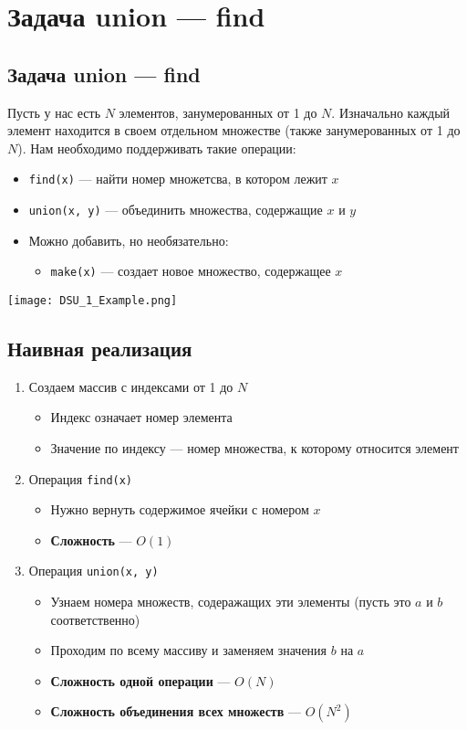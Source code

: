 \documentclass[a4paper]{article}
\newcommand{\code}[1]{\colorbox{codegray}{\texttt{#1}}}
\begin{document}
\section{Задача union — find}
\subsection{Задача union — find}
Пусть у нас есть $N$ элементов, занумерованных от 1 до $N$. Изначально каждый элемент находится в своем отдельном множестве (также занумерованных от 1 до $N$). Нам необходимо поддерживать такие операции:
\begin{itemize}
    \item \code{find(x)} — найти номер множетсва, в котором лежит $x$
    \item \code{union(x, y)} — объединить множества, содержащие $x$ и $y$
    \item Можно добавить, но необязательно:
    \begin{itemize}
        \item \code{make(x)} — создает новое множество, содержащее $x$ 
    \end{itemize}
\end{itemize}
\begin{center}
    \texttt{[image: DSU\_1\_Example.png]}
    \label{union-find}
\end{center}

\subsection{Наивная реализация}
\begin{enumerate}
    \item Создаем массив с индексами от 1 до $N$
    \begin{itemize}
        \item Индекс означает номер элемента
        \item Значение по индексу — номер множества, к которому относится элемент
    \end{itemize}
    \item Операция \code{find(x)}
    \begin{itemize}
        \item Нужно вернуть содержимое ячейки с номером $x$
        \item \textbf{Сложность} — $O(1)$
    \end{itemize}
    \item Операция \code{union(x, y)}
    \begin{itemize}
        \item Узнаем номера множеств, содеражащих эти элементы (пусть это $a$ и $b$ соответственно)
        \item Проходим по всему массиву и заменяем значения $b$ на $a$
        \item \textbf{Сложность одной операции} — $O(N)$
        \item \textbf{Сложность объединения всех множеств} — $O(N^2)$
    \end{itemize}
\end{enumerate}
\end{document}
